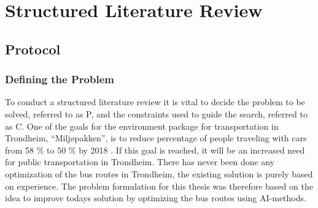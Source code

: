 \chapter{Structured Literature Review}

\label{appendixA}
\section{Protocol}

\subsection{Defining the Problem}
\label{sec:researchQSLR}
To conduct a structured literature review it is vital to decide the problem to be solved, referred to as P, and the constraints used to guide the search, referred to as C.
\newline
\newline
One of the goals for the environment package for transportation in Trondheim, ``Miljøpakken'', is to reduce percentage of people traveling with cars from 58 \% to 50 \% by 2018 \citep{website:miljopakken}. If this goal is reached, it will be an increased need for public transportation in Trondheim. There has never been done any optimization of the bus routes in Trondheim, the existing solution is purely based on experience. The problem formulation for this thesis was therefore based on the idea to improve todays solution by optimizing the bus routes using AI-methods. 

